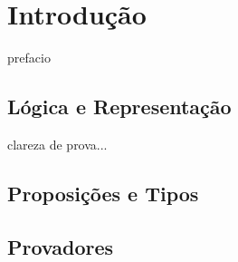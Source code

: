\chapter{Introdução}

prefacio

\section{Lógica e Representação}

clareza de prova...

\section{Proposições e Tipos}

\section{Provadores}



